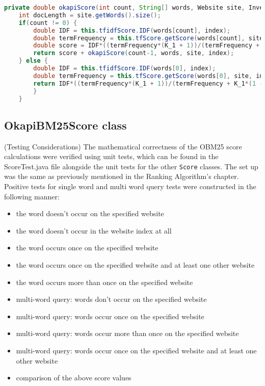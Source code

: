 \begin{lstlisting}[language=Java]
    private double okapiScore(int count, String[] words, Website site, InvertedIndex index) {
    int docLength = site.getWords().size();
    if(count != 0) {
        double IDF = this.tfidfScore.IDF(words[count], index);
        double termFrequency = this.tfScore.getScore(words[count], site, index);
        double score = IDF*((termFrequency*(K_1 + 1))/(termFrequency + K_1*(1 - B + B*(docLength/AVERAGE_DOC_LENGTH))));
        return score + okapiScore(count-1, words, site, index);
    } else {
        double IDF = this.tfidfScore.IDF(words[0], index);
        double termFrequency = this.tfScore.getScore(words[0], site, index);
        return IDF*((termFrequency*(K_1 + 1))/(termFrequency + K_1*(1 - B + B*(docLength/AVERAGE_DOC_LENGTH))));
        }
    }
\end{lstlisting}

\subsection{OkapiBM25Score class} (Testing Considerations)
The mathematical correctness of the OBM25 score calculations were verified using unit tests, which can be found in the ScoreTest.java file alongside the unit tests for the other {\tt Score} classes.
The set up was the same as previously mentioned in the Ranking Algorithm's chapter.
Positive tests for single word and multi word query tests were constructed in the following manner:

\begin{itemize}
    \item the word doesn't occur on the specified website
    \item the word doesn't occur in the website index at all
    \item the word occurs once on the specified website
    \item the word occurs once on the specified website and at least one other website
    \item the word occurs more than once on the specified website
    \item multi-word query: words don't occur on the specified website
    \item multi-word query: words occur once on the specified website
    \item multi-word query: words occur more than once on the specified website
    \item multi-word query: words occur once on the specified website and at least one other website
    \item comparison of the above score values
\end{itemize}


